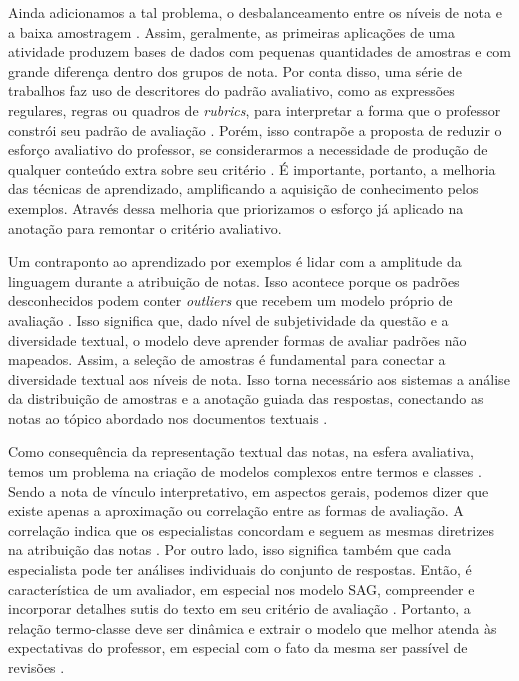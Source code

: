 Ainda adicionamos a tal problema, o desbalanceamento entre os níveis de nota e a baixa amostragem \cite{dzikovska2012, lui2022}. Assim, geralmente, as primeiras aplicações de uma atividade produzem bases de dados com pequenas quantidades de amostras e com grande diferença dentro dos grupos de nota. Por conta disso, uma série de trabalhos faz uso de descritores do padrão avaliativo, como as expressões regulares, regras ou quadros de \textit{rubrics}, para interpretar a forma que o professor constrói seu padrão de avaliação \cite{butcher2010, mohler2011, ramachandran2015a, condor2021}. Porém, isso contrapõe a proposta de reduzir o esforço avaliativo do professor, se considerarmos a necessidade de produção de qualquer conteúdo extra sobre seu critério \cite{zesch2015, horbach2018}. É importante, portanto, a melhoria das técnicas de aprendizado, amplificando a aquisição de conhecimento pelos exemplos. Através dessa melhoria que priorizamos o esforço já aplicado na anotação para remontar o critério avaliativo.

Um contraponto ao aprendizado por exemplos é lidar com a amplitude da linguagem durante a atribuição de notas. Isso acontece porque os padrões desconhecidos podem conter \textit{outliers} que recebem um modelo próprio de avaliação \cite{filighera2020}. Isso significa que, dado nível de subjetividade da questão e a diversidade textual, o modelo deve aprender formas de avaliar padrões não mapeados. Assim, a seleção de amostras é fundamental para conectar a diversidade textual aos níveis de nota. Isso torna necessário aos sistemas a análise da distribuição de amostras e a anotação guiada das respostas, conectando as notas ao tópico abordado nos documentos textuais \cite{marvaniya2018}.

Como consequência da representação textual das notas, na esfera avaliativa, temos um problema na criação de modelos complexos entre termos e classes \cite{ramachandran2015a}. Sendo a nota de vínculo interpretativo, em aspectos gerais, podemos dizer que existe apenas a aproximação ou correlação entre as formas de avaliação. A correlação indica que os especialistas concordam e seguem as mesmas diretrizes na atribuição das notas \cite{artstein2008}. Por outro lado, isso significa também que cada especialista pode ter análises individuais do conjunto de respostas. Então, é característica de um avaliador, em especial nos modelo SAG, compreender e incorporar detalhes sutis do texto em seu critério de avaliação \cite{horbach2018, condor2021}. Portanto, a relação termo-classe deve ser dinâmica e extrair o modelo que melhor atenda às expectativas do professor, em especial com o fato da mesma ser passível de revisões \cite{spalenza2016a}.

